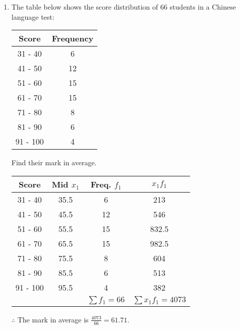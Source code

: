 \documentclass{report}
\begin{document}
\begin{multicols}{2}
\begin{enumerate}
    \item The table below shows the score distribution of 66 students in a Chinese
          language test:
          \begin{center}
            \begin{tabular}{|c|c|}
              \hline
              Score    & Frequency \\
              \hline
              31 - 40  & 6         \\
              41 - 50  & 12        \\
              51 - 60  & 15        \\
              61 - 70  & 15        \\
              71 - 80  & 8         \\
              81 - 90  & 6         \\
              91 - 100 & 4         \\
              \hline
            \end{tabular}
          \end{center}
          Find their mark in average.
          \begin{center}
            \begin{tabular}{|c|c|c|c|}
              \hline
              Score    & Mid $x_1$ & Freq. $f_1$     & $x_1f_1$             \\
              \hline
              31 - 40  & 35.5      & 6               & 213                  \\
              41 - 50  & 45.5      & 12              & 546                  \\
              51 - 60  & 55.5      & 15              & 832.5                \\
              61 - 70  & 65.5      & 15              & 982.5                \\
              71 - 80  & 75.5      & 8               & 604                  \\
              81 - 90  & 85.5      & 6               & 513                  \\
              91 - 100 & 95.5      & 4               & 382                  \\
              \hline
                       &           & $\sum f_1 = 66$ & $\sum x_1f_1 = 4073$ \\
              \hline
            \end{tabular}
          \end{center}
          $\therefore$ The mark in average is $\frac{4073}{66} = 61.71$.


\end{enumerate}
\end{multicols}
\end{document}
